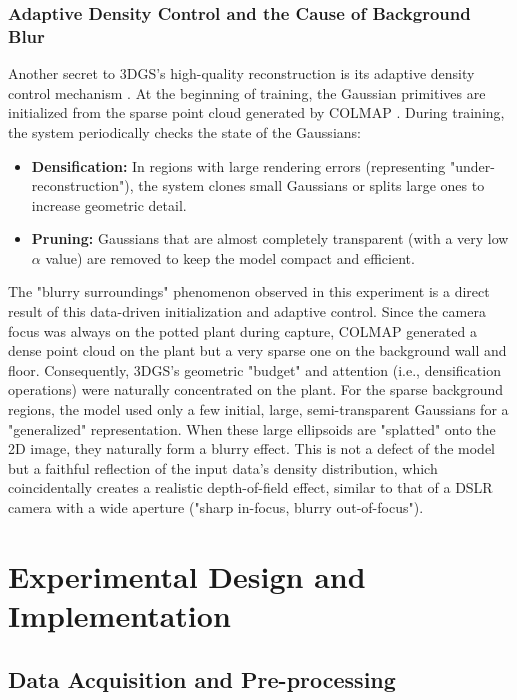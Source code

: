 \documentclass[11pt]{article}
\begin{document}
\subsubsection{Adaptive Density Control and the Cause of Background Blur}
Another secret to 3DGS's high-quality reconstruction is its adaptive density control mechanism \cite{freq_aware_3dgs}. At the beginning of training, the Gaussian primitives are initialized from the sparse point cloud generated by COLMAP \cite{learnopencv_3dgs}. During training, the system periodically checks the state of the Gaussians:
\begin{itemize}
    \item \textbf{Densification:} In regions with large rendering errors (representing "under-reconstruction"), the system clones small Gaussians or splits large ones to increase geometric detail.
    \item \textbf{Pruning:} Gaussians that are almost completely transparent (with a very low $\alpha$ value) are removed to keep the model compact and efficient.
\end{itemize}
The "blurry surroundings" phenomenon observed in this experiment is a direct result of this data-driven initialization and adaptive control. Since the camera focus was always on the potted plant during capture, COLMAP generated a dense point cloud on the plant but a very sparse one on the background wall and floor. Consequently, 3DGS's geometric "budget" and attention (i.e., densification operations) were naturally concentrated on the plant. For the sparse background regions, the model used only a few initial, large, semi-transparent Gaussians for a "generalized" representation. When these large ellipsoids are "splatted" onto the 2D image, they naturally form a blurry effect. This is not a defect of the model but a faithful reflection of the input data's density distribution, which coincidentally creates a realistic depth-of-field effect, similar to that of a DSLR camera with a wide aperture ("sharp in-focus, blurry out-of-focus").

\section{Experimental Design and Implementation}

\subsection{Data Acquisition and Pre-processing}
\end{document}
